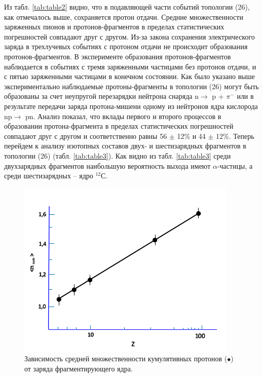 \documentclass[fontsize=14pt]{scrreport}
\begin{document}
Из табл. \ref{tab:table2} видно, что в подавляющей части событий топологии (26), как отмечалось выше, сохраняется протон отдачи. Средние множественности заряженных пионов и протонов-фрагментов в пределах статистических погрешностей совпадают друг с другом. Из-за закона сохранения электрического заряда в трехлучевых событиях с протоном отдачи не происходит образования протонов-фрагментов. В эксперименте образования протонов-фрагментов наблюдается в событиях с тремя заряженными частицами без протонов отдачи, и с пятью заряженными частицами в конечном состоянии. Как было указано выше экспериментально наблюдаемые протоны-фрагменты в топологии (26) могут быть образованы за счет неупругой перезарядки нейтрона снаряда       n$\rightarrow$ p + $\pi^{-}$ или в результате передачи заряда протона-мишени одному из нейтронов ядра кислорода np$\rightarrow$ pn. Анализ показал, что вклады первого и второго процессов в образовании протона-фрагмента в пределах статистических погрешностей совпадают друг с другом и соответственно равны 56 $\pm$ 12\% и 44 $\pm$ 12\%. Теперь перейдем к анализу изотопных составов двух- и шестизарядных фрагментов в топологии (26) (табл. \ref{tab:table3}). Как видно из табл. \ref{tab:table3} среди двухзарядных фрагментов наибольшую вероятность выхода имеют $\alpha$-частицы, а среди шестизарядных – ядро $^{12}$С. 

\begin{figure}[!ht]
\centerline{\includegraphics{picture12.png}}
\caption{Зависимость средней множественности кумулятивных протонов ($\bullet$) от заряда фрагментирующего ядра.}
\label{fig13}
\end{figure}
\end{document}
